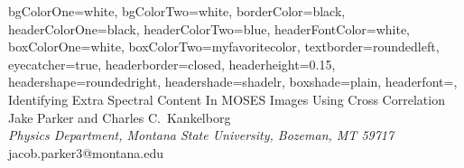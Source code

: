 \documentclass[landscape,paperwidth=43truein,paperheight=33.1truein,fontscale=0.3]{baposter}
\begin{document}

\begin{poster}
{%
  bgColorOne=white,
  bgColorTwo=white,
  borderColor=black,
  headerColorOne=black,
  headerColorTwo=blue,
  headerFontColor=white,
  boxColorOne=white,
  boxColorTwo=myfavoritecolor,
  textborder=roundedleft,
  eyecatcher=true,
  headerborder=closed,
  headerheight=0.15\textheight,
  headershape=roundedright,
  headershade=shadelr,
  boxshade=plain,
  headerfont=\Large\textrm,
}
{%
}
{%
   {Identifying Extra Spectral Content In MOSES Images Using Cross Correlation}
}
{%
   Jake Parker and Charles C.\ Kankelborg\\
   \textit{Physics Department, Montana State University, Bozeman, MT 59717}\\
   jacob.parker3@montana.edu\\
   
}
\end{poster}
\end{document}
